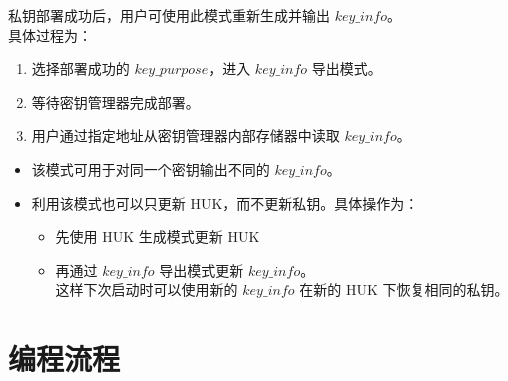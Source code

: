 \documentclass[main\_\_CN.tex]{subfiles}
\begin{document}
私钥部署成功后，用户可使用此模式重新生成并输出 \hyperref[para:keyinfo]{\begin{math}key\_info\end{math}}。\\
具体过程为：
\begin{enumerate}
    \item 选择部署成功的 \begin{math}key\_purpose\end{math}，进入 \hyperref[para:keyinfo]{\begin{math}key\_info\end{math}} 导出模式。
    \item 等待密钥管理器完成部署。
    \item 用户通过指定地址从密钥管理器内部存储器中读取 \hyperref[para:keyinfo]{\begin{math}key\_info\end{math}}。
\end{enumerate}

\vspace{-0.5em}
\begin{tiplisting}
\vspace{-2em}
\begin{itemize}
    \item 该模式可用于对同一个密钥输出不同的 \hyperref[para:keyinfo]{\begin{math}key\_info\end{math}}。
    \item 利用该模式也可以只更新 HUK，而不更新私钥。具体操作为：
    \begin{itemize}
        \item 先使用 HUK 生成模式更新 HUK
        \item 再通过 \hyperref[para:keyinfo]{\begin{math}key\_info\end{math}} 导出模式更新 \hyperref[para:keyinfo]{\begin{math}key\_info\end{math}}。\\
        这样下次启动时可以使用新的 \hyperref[para:keyinfo]{\begin{math}key\_info\end{math}} 在新的 HUK 下恢复相同的私钥。
    \end{itemize}
\end{itemize}
\end{tiplisting}


\section{编程流程}
\label{sec:keymng-prog-procedures}
\end{document}
